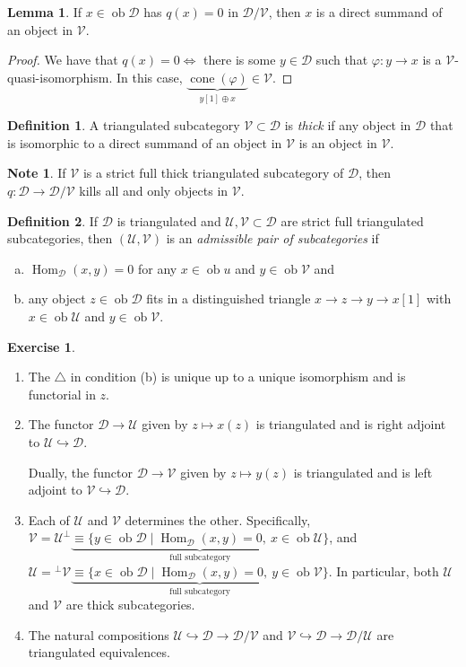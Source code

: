 \documentclass[10pt,letterpaper,cm]{nupset}
\theoremstyle{definition}
\newtheorem*{definition}{Definition}
\newtheorem{note}{Note}
\newtheorem{lemma}{Lemma}
\newtheorem{exercise}{Exercise}
\newcommand{\1}{\mathbf{1}}
\renewcommand{\d}{\mathscr{D}}
\renewcommand{\u}{\mathscr{U}}
\renewcommand{\v}{\mathscr{V}}
\newcommand{\0}{\vec 0}
\DeclareMathOperator{\ob}{ob}
\DeclareMathOperator{\Hom}{Hom}
\DeclareMathOperator{\cone}{cone}
\begin{document}
\begin{lemma}
If $x \in \ob{\d}$ has $q(x) = 0$ in $\d/\v$, then $x$ is a direct summand of an object in $\v$.
\end{lemma}
\begin{proof}
We have that $q(x) =0 \iff$ there is some $y\in \d$ such that $\varphi : y \to x$ is a $\v$-quasi-isomorphism. In this case, $\underbrace{\cone(\varphi)}_{y[1] \oplus x} \in \v$.
\end{proof}

\begin{definition}
A triangulated subcategory $\v \subset \d$ is \textit{thick} if any object in $\d$ that is isomorphic to a direct summand of an object in $\v$ is an object in $\v$. 
\end{definition}

\begin{note}
If $\v$ is a strict full thick triangulated subcategory	 of $\d$, then $q : \d \to \d/\v$ kills all and only objects in $\v$. 
\end{note}

\begin{definition}
If $\d$ is triangulated and $\u, \v \subset \d$ are strict full triangulated subcategories, then $(\u, \v)$ is an \textit{admissible pair of subcategories} if 
\begin{enumerate}[(a)]
\item $\Hom_{\d}(x,y) =0$ for any $x \in \ob{u}$ and $y \in \ob{\v}$ and
\item any object $z \in \ob{\d}$ fits in a distinguished triangle $x \to z \to y \to x[1]$ with $x \in \ob{\u}$ and $y \in \ob{\v}$. 
\end{enumerate}
\end{definition}

\begin{exercise} $ $
\begin{enumerate}
\item The $\triangle$ in condition (b) is unique up to a unique isomorphism and is functorial in $z$.
\item The functor $\d \to \u$ given by $z \mapsto x(z)$ is triangulated and is right adjoint to $\u \hookrightarrow \d$. 

Dually, the functor $\d \to \v$ given by $z \mapsto y(z)$ is triangulated and is left adjoint to $\v \hookrightarrow \d$.
\item Each of $\u$ and $\v$ determines the other. Specifically, $\v = \u^{\perp} \underbrace{\equiv \{y \in \ob{\d} \mid \Hom_{\d}(x,y) = 0, \ x \in \ob{\u}\}}_{\text{full subcategory}}$, and $\u = {^{\perp}{\v}} \underbrace{\equiv \{x \in \ob{\d} \mid \Hom_{\d}(x,y) =0, \ y \in \ob{\v}\}}_{\text{full subcategory}}$. In particular, both $\u$ and $\v$ are thick subcategories. 
\item The natural compositions $\u \hookrightarrow \d \to \d/\v$ and $\v \hookrightarrow \d \to \d/\u$ are triangulated equivalences. 
\end{enumerate}
\end{exercise}
\end{document}
